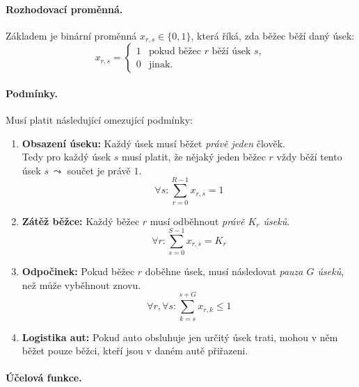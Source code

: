 \documentclass[10pt, a4paper]{article}
\begin{document}
	\paragraph*{Rozhodovací proměnná.}
	Základem je binární proměnná $x_{r,s} \in \{0,1\}$, která říká, zda běžec běží daný úsek:
	\[
	x_{r,s} = 
	\begin{cases} 
		1 & \text{pokud běžec } r \text{ běží úsek } s, \\
		0 & \text{jinak.}
	\end{cases}
	\]
	
	\paragraph*{Podmínky.} Musí platit následující omezující podmínky:
	
	\begin{enumerate}[(1)]
		\item \textbf{Obsazení úseku:} Každý úsek musí běžet \textit{právě jeden} člověk.\\
		Tedy pro každý úsek $s$ musí platit, že nějaký jeden běžec $r$ vždy běží tento úsek $s ~ \leadsto$ součet je právě $1$.
		\[ \forall s: \sum_{r=0}^{R-1} x_{r,s} = 1 \]
		
		\item \textbf{Zátěž běžce:} Každý běžec $r$ musí odběhnout \textit{právě $K_r$ úseků}.
		\[ \forall r: \sum_{s=0}^{S-1} x_{r,s} = K_r \]
		
		\item \textbf{Odpočinek:} Pokud běžec $r$ doběhne úsek, musí následovat \textit{pauza $G$ úseků}, než může vyběhnout znovu.
		\[ \forall r, \forall s: \sum_{k=s}^{s+G} x_{r,k} \le 1 \]
		
		\item \textbf{Logistika aut:} Pokud auto obsluhuje jen určitý úsek trati, mohou v něm běžet pouze běžci, kteří jsou v daném autě přiřazeni.
	\end{enumerate}
	
	\paragraph*{Účelová funkce.}
	
\end{document}
